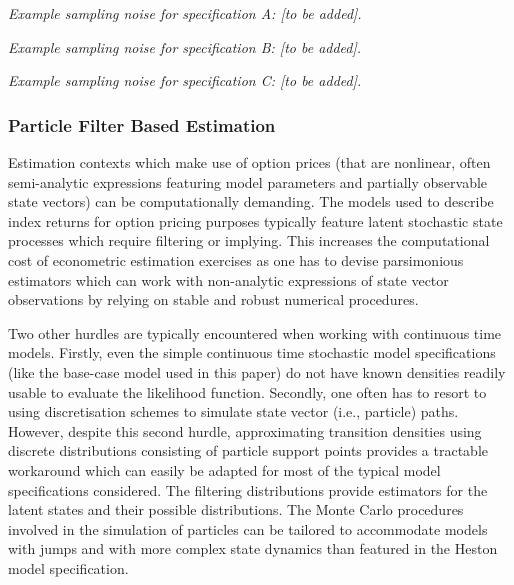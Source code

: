 \documentclass[11pt,a4paper,notitlepage]{article}
\numberwithin{equation}{section}
\begin{document}
\emph{Example sampling noise for specification A: [to be added].}

\emph{Example sampling noise for specification B: [to be added].}

\emph{Example sampling noise for specification C: [to be added].}

\subsubsection{Particle Filter Based Estimation}
Estimation contexts which make use of option prices (that are nonlinear, often semi-analytic expressions featuring model parameters and partially observable state vectors) can be computationally demanding. The models used to describe index returns for option pricing purposes typically feature latent stochastic state processes which require filtering  or implying. This increases the computational cost of econometric estimation exercises as one has to devise parsimonious estimators which can work with non-analytic expressions of state vector observations by relying on stable and robust numerical procedures. 


Two other hurdles are typically encountered when working with continuous time models. Firstly, even the simple continuous time stochastic model specifications (like the base-case model used in this paper) do not have known densities readily usable to evaluate the likelihood function. Secondly, one often has to resort to using discretisation schemes to simulate state vector (i.e., particle) paths. However, despite this second hurdle, approximating transition densities using discrete distributions consisting of particle support points provides a tractable workaround which can easily be adapted for most of the typical model specifications considered. The filtering distributions provide estimators for the latent states and their possible distributions. The Monte Carlo procedures involved in the simulation of particles can be tailored to accommodate models with jumps and with more complex state dynamics than featured in the Heston model specification. 
\end{document}
